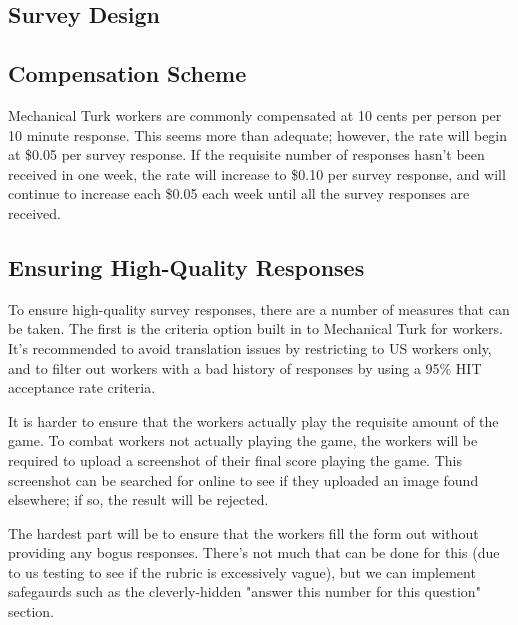 	\subsection{Survey Design}
	\subsection{Compensation Scheme}
		Mechanical Turk workers are commonly compensated at 10 cents per person per 10 minute response. This seems more than adequate; however, the rate will begin at \$0.05 per survey response. If the requisite number of responses hasn't been received in one week, the rate will increase to \$0.10 per survey response, and will continue to increase each \$0.05 each week until all the survey responses are received.
	\subsection{Ensuring High-Quality Responses}
		To ensure high-quality survey responses, there are a number of measures that can be taken. The first is the criteria option built in to Mechanical Turk for workers. It's recommended to avoid translation issues by restricting to US workers only, and to filter out workers with a bad history of responses by using a 95\% HIT acceptance rate criteria.

		It is harder to ensure that the workers actually play the requisite amount of the game. To combat workers not actually playing the game, the workers will be required to upload a screenshot of their final score playing the game. This screenshot can be searched for online to see if they uploaded an image found elsewhere; if so, the result will be rejected.

		The hardest part will be to ensure that the workers fill the form out without providing any bogus responses. There's not much that can be done for this (due to us testing to see if the rubric is excessively vague), but we can implement safegaurds such as the cleverly-hidden "answer this number for this question" section.